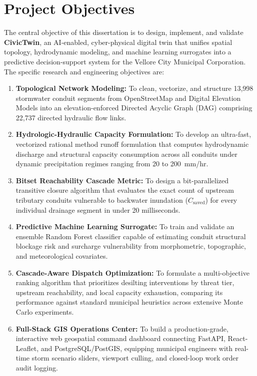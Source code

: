 \section{Project Objectives}
The central objective of this dissertation is to design, implement, and validate \textbf{CivicTwin}, an AI-enabled, cyber-physical digital twin that unifies spatial topology, hydrodynamic modeling, and machine learning surrogates into a predictive decision-support system for the Vellore City Municipal Corporation. The specific research and engineering objectives are:
\begin{enumerate}
    \item \textbf{Topological Network Modeling:} To clean, vectorize, and structure 13,998 stormwater conduit segments from OpenStreetMap and Digital Elevation Models into an elevation-enforced Directed Acyclic Graph (DAG) comprising 22,737 directed hydraulic flow links.
    \item \textbf{Hydrologic-Hydraulic Capacity Formulation:} To develop an ultra-fast, vectorized rational method runoff formulation that computes hydrodynamic discharge and structural capacity consumption across all conduits under dynamic precipitation regimes ranging from 20 to 200~mm/hr.
    \item \textbf{Bitset Reachability Cascade Metric:} To design a bit-parallelized transitive closure algorithm that evaluates the exact count of upstream tributary conduits vulnerable to backwater inundation ($C_{\text{saved}}$) for every individual drainage segment in under 20 milliseconds.
    \item \textbf{Predictive Machine Learning Surrogate:} To train and validate an ensemble Random Forest classifier capable of estimating conduit structural blockage risk and surcharge vulnerability from morphometric, topographic, and meteorological covariates.
    \item \textbf{Cascade-Aware Dispatch Optimization:} To formulate a multi-objective ranking algorithm that prioritizes desilting interventions by threat tier, upstream reachability, and local capacity exhaustion, comparing its performance against standard municipal heuristics across extensive Monte Carlo experiments.
    \item \textbf{Full-Stack GIS Operations Center:} To build a production-grade, interactive web geospatial command dashboard connecting FastAPI, React-Leaflet, and PostgreSQL/PostGIS, equipping municipal engineers with real-time storm scenario sliders, viewport culling, and closed-loop work order audit logging.
\end{enumerate}

